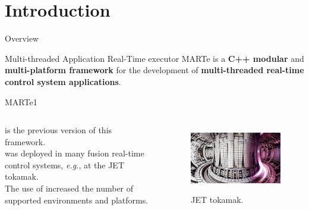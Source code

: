 
\section{Introduction}
\graphicspath{{figs/section1/}}

\begin{frame}{Overview}
	\begin{block}{Multi-threaded Application Real-Time executor}
		MARTe is a \textbf{C++ modular} and \textbf{multi-platform framework} for the development of \textbf{multi-threaded real-time control system applications}.
	\end{block}
\end{frame}

\begin{frame}{MARTe1}
	\begin{columns}
			 is the previous version of this framework.\\
      \bigskip
			 was deployed in many fusion real-time control systems, \emph{e.g.}, at the JET tokamak.\\
      \bigskip
			The use of  increased the number of supported environments and platforms.
		\begin{figure}
			\centering
			\includegraphics[scale=.5]{JET.jpeg}
			\label{fig:jet}
			\caption{JET tokamak.}
		\end{figure}
	\end{columns}
\end{frame}
